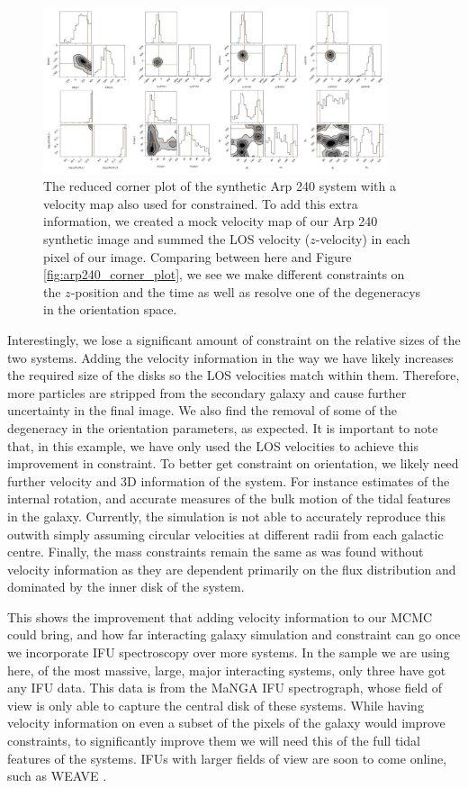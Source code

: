 \begin{figure}
    \centering
    \includegraphics[width=0.9\textwidth]{Chapter1/figures/Arp240_vel-red-corner.pdf}
    \caption{The reduced corner plot of the synthetic Arp 240 system with a velocity map also used for constrained. To add this extra information, we created a mock velocity map of our Arp 240 synthetic image and summed the LOS velocity ($z$-velocity) in each pixel of our image. Comparing between here and Figure \ref{fig:arp240_corner_plot}, we see we make different constraints on the $z$-position and the time as well as resolve one of the degeneracys in the orientation space.}
    \label{fig:velocity_corner_plot}
\end{figure}

Interestingly, we lose a significant amount of constraint on the relative sizes of the two systems. Adding the velocity information in the way we have likely increases the required size of the disks so the LOS velocities match within them. Therefore, more particles are stripped from the secondary galaxy and cause further uncertainty in the final image. We also find the removal of some of the degeneracy in the orientation parameters, as expected. It is important to note that, in this example, we have only used the LOS velocities to achieve this improvement in constraint. To better get constraint on orientation, we likely need further velocity and 3D information of the system. For instance estimates of the internal rotation, and accurate measures of the bulk motion of the tidal features in the galaxy. Currently, the simulation is not able to accurately reproduce this outwith simply assuming circular velocities at different radii from each galactic centre. Finally, the mass constraints remain the same as was found without velocity information as they are dependent primarily on the flux distribution and dominated by the inner disk of the system.


This shows the improvement that adding velocity information to our MCMC could bring, and how far interacting galaxy simulation and constraint can go once we incorporate IFU spectroscopy over more systems. In the sample we are using here, of the most massive, large, major interacting systems, only three have got any IFU data. This data is from the MaNGA \citep{2015ApJ...798....7B} IFU spectrograph, whose field of view is only able to capture the central disk of these systems. While having velocity information on even a subset of the pixels of the galaxy would improve constraints, to significantly improve them we will need this of the full tidal features of the systems. IFUs with larger fields of view are soon to come online, such as WEAVE \citep{2014SPIE.9147E..0LD}. 

